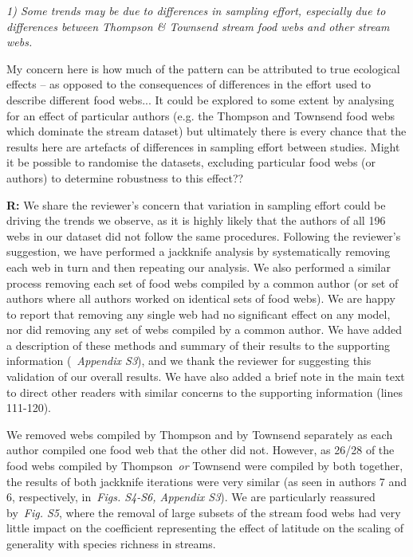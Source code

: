 \documentclass[12pt]{letter}
\newenvironment{refquote}{\bigskip \begin{it}}{\end{it}\smallskip}
\begin{document}
  \emph{
  1) Some trends may be due to differences in sampling effort, especially
  due to differences between Thompson \& Townsend stream food webs and other
  stream webs.}


  \begin{refquote}

    My concern here is how much of the pattern can be attributed to true
    ecological effects – as opposed to the consequences of differences in the
    effort used to describe different food webs... It could be explored to some extent by
    analysing for an effect of particular authors (e.g. the Thompson and
    Townsend food webs which dominate the stream dataset) but ultimately there
    is every chance that the results here are artefacts of differences in
    sampling effort between studies. Might it be possible to randomise the
    datasets, excluding particular food webs (or authors) to determine
    robustness to this effect?? 

  \end{refquote}


  \textbf{R:} We share the reviewer's concern that variation in sampling
  effort could be driving the trends we observe, as it is highly likely that
  the authors of all 196 webs in our dataset did not follow the same procedures.
  Following the reviewer's suggestion, we have performed a jackknife analysis by
  systematically removing each web in turn and then repeating our analysis. We
  also performed a similar process removing each set of 
  food webs compiled by a common author (or set of authors
  where all authors worked on identical sets of food webs).
  We are happy to report that removing
  any single web had no significant effect on any model, 
  nor did removing any set of webs compiled by a common 
  author. 
  We have added a description of these methods and summary
  of their results to the supporting information 
  (~\emph{Appendix S3}), and we thank the reviewer for 
  suggesting this validation of our overall results. We 
  have also added a brief note in the main text to direct 
  other readers with similar concerns to the supporting 
  information (lines 111-120). 


  We removed webs compiled by Thompson and by 
  Townsend separately as each author compiled one food
  web that the other did not. However, as 26/28 of the
  food webs compiled by Thompson~\emph{or} Townsend were
  compiled by both together, the results of both jackknife
  iterations were very similar (as seen in authors 7 and 6, 
  respectively, in~\emph{Figs. S4-S6, Appendix S3}). 
  We are particularly reassured by~\emph{Fig. S5}, where
  the removal of large subsets of the stream food webs
  had very little impact on the coefficient representing
  the effect of latitude on the scaling of generality with
  species richness in streams.
\end{document}
